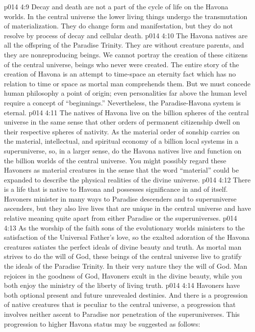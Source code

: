 \pc \vs p014 4:9 Decay and death are not a part of the cycle of life on the Havona worlds. In the central universe the lower living things undergo the transmutation of materialization. They do change form and manifestation, but they do not resolve by process of decay and cellular death.
\pc \vs p014 4:10 The Havona natives are all the offspring of the Paradise Trinity. They are without creature parents, and they are nonreproducing beings. We cannot portray the creation of these citizens of the central universe, beings who never were created. The entire story of the creation of Havona is an attempt to time\hyp{}space an eternity fact which has no relation to time or space as mortal man comprehends them. But we must concede human philosophy a point of origin; even personalities far above the human level require a concept of “beginnings.” Nevertheless, the Paradise\hyp{}Havona system is eternal.
\vs p014 4:11 The natives of Havona live on the billion spheres of the central universe in the same sense that other orders of permanent citizenship dwell on their respective spheres of nativity. As the material order of sonship carries on the material, intellectual, and spiritual economy of a billion local systems in a superuniverse, so, in a larger sense, do the Havona natives live and function on the billion worlds of the central universe. You might possibly regard these Havoners as material creatures in the sense that the word “material” could be expanded to describe the physical realities of the divine universe.
\vs p014 4:12 There is a life that is native to Havona and possesses significance in and of itself. Havoners minister in many ways to Paradise descenders and to superuniverse ascenders, but they also live lives that are unique in the central universe and have relative meaning quite apart from either Paradise or the superuniverses.
\vs p014 4:13 As the worship of the faith sons of the evolutionary worlds ministers to the satisfaction of the Universal Father’s love, so the exalted adoration of the Havona creatures satiates the perfect ideals of divine beauty and truth. As mortal man strives to do the will of God, these beings of the central universe live to gratify the ideals of the Paradise Trinity. In their very nature they  the will of God. Man rejoices in the goodness of God, Havoners exult in the divine beauty, while you both enjoy the ministry of the liberty of living truth.
\vs p014 4:14 Havoners have both optional present and future unrevealed destinies. And there is a progression of native creatures that is peculiar to the central universe, a progression that involves neither ascent to Paradise nor penetration of the superuniverses. This progression to higher Havona status may be suggested as follows:
